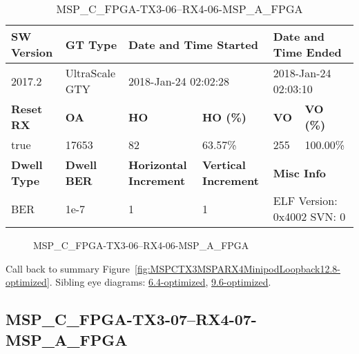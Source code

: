 \begin{table}[h]
\centering
\caption{MSP\_C\_FPGA-TX3-06--RX4-06-MSP\_A\_FPGA}
\label{tab:MSPCFPGATX306RX406MSPAFPGA12.8-optimized}
\begin{tabular}{@{}|l|l|l|l|l|l|@{}}
\toprule
\textbf{SW Version}                & \textbf{GT Type}   & \multicolumn{2}{l|}{\textbf{Date and Time Started}}            & \multicolumn{2}{l|}{\textbf{Date and Time Ended}}        \\ \midrule
2017.2                       & UltraScale GTY          & \multicolumn{2}{l|}{2018-Jan-24 02:02:28}                   & \multicolumn{2}{l|}{2018-Jan-24 02:03:10}               \\ \midrule
\textbf{Reset RX}                  & \textbf{OA} & \textbf{HO}   & \textbf{HO (\%)} & \textbf{VO} & \textbf{VO (\%)} \\ \midrule
true & 17653        & 82          & 63.57\%        & 255        & 100.00\%       \\ \midrule
\textbf{Dwell Type}                & \textbf{Dwell BER} & \textbf{Horizontal Increment} & \textbf{Vertical Increment}    & \multicolumn{2}{l|}{\textbf{Misc Info}}                  \\ \midrule
BER                            & 1e-7        & 1        & 1           & \multicolumn{2}{l|}{ELF Version: 0x4002 SVN: 0}                         \\ \bottomrule
\end{tabular}
\end{table}

\begin{figure}[h]
\caption{MSP\_C\_FPGA-TX3-06--RX4-06-MSP\_A\_FPGA} \label{fig:MSPCFPGATX306RX406MSPAFPGA12.8-optimized}
\end{figure}

Call back to summary Figure~\ref{fig:MSPCTX3MSPARX4MinipodLoopback12.8-optimized}.
Sibling eye diagrams: \hyperref[sec:MSPCFPGATX306RX406MSPAFPGA6.4-optimized]{6.4-optimized}, \hyperref[sec:MSPCFPGATX306RX406MSPAFPGA9.6-optimized]{9.6-optimized}.

\clearpage
\newpage


\subsection{MSP\_C\_FPGA-TX3-07--RX4-07-MSP\_A\_FPGA}\label{sec:MSPCFPGATX307RX407MSPAFPGA12.8-optimized}

